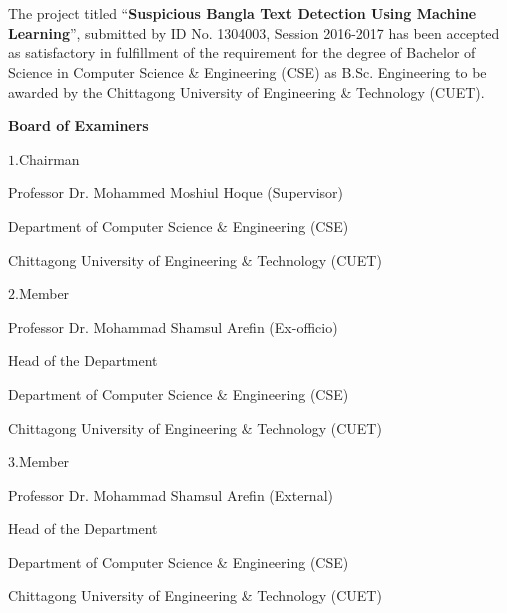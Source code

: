 \section*{}
The project titled \enquote{{\bfseries Suspicious Bangla Text Detection Using Machine Learning}}, submitted by ID No. 1304003, Session 2016-2017 has been accepted as satisfactory in fulfillment of the requirement for the degree of Bachelor of Science in Computer Science \& Engineering (CSE) as B.Sc. Engineering to be awarded by the Chittagong University of Engineering \& Technology (CUET).\par 
\vspace{1.5cm}
{\hfil \Large\bfseries Board of Examiners}\par
\vspace{1.5cm}
 $1.$\underline{\hspace{8cm}}\hspace{3.5cm}Chairman\par
 \vspace{.5cm}
 Professor Dr. Mohammed Moshiul Hoque \hspace{4cm}(Supervisor)\par 
 Department of Computer Science \& Engineering (CSE)\par
 Chittagong University of Engineering \& Technology (CUET)\par 
\par 
\vspace{1.5cm}
 $2.$\underline{\hspace{8cm}}\hspace{3.5cm}Member\par
 \vspace{.5cm}
 Professor Dr. Mohammad Shamsul Arefin \hspace{4cm}(Ex-officio)\par
 Head of the Department\par
 Department of Computer Science \& Engineering (CSE)\par 
 Chittagong University of Engineering \& Technology (CUET)\par 
\par 
\vspace{1.5cm}
 $3.$\underline{\hspace{8cm}}\hspace{3.5cm}Member\par
 \vspace{.5cm}
 Professor Dr. Mohammad Shamsul Arefin \hspace{4cm}(External)\par 
 Head of the Department\par 
 Department of Computer Science \& Engineering (CSE)\par
 Chittagong University of Engineering \& Technology (CUET)\par 
\clearpage



